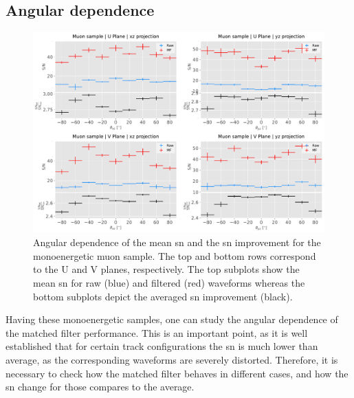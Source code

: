 \subsection{Angular dependence}
\label{subsec:2.5.1}

\begin{figure}[t]
	\centering
	\includegraphics[width=0.9\linewidth]{Images/Matched_Filter/larsoft_muon_angular_alt.pdf}
	\caption[Angular dependence of the mean \gls{sn} and the \gls{sn} improvement for the monoenergetic muon sample.]{Angular dependence of the mean \gls{sn} and the \gls{sn} improvement for the monoenergetic muon sample. The top and bottom rows correspond to the U and V planes, respectively. The top subplots show the mean \gls{sn} for raw (blue) and filtered (red) waveforms whereas the bottom subplots depict the averaged \gls{sn} improvement (black).}
	\label{fig:angular_muon}
\end{figure}

Having these monoenergetic samples, one can study the angular dependence of the matched filter performance. This is an important point, as it is well established that for certain track configurations the \gls{sn} is much lower than average, as the corresponding waveforms are severely distorted. Therefore, it is necessary to check how the matched filter behaves in different cases, and how the \gls{sn} change for those compares to the average.

